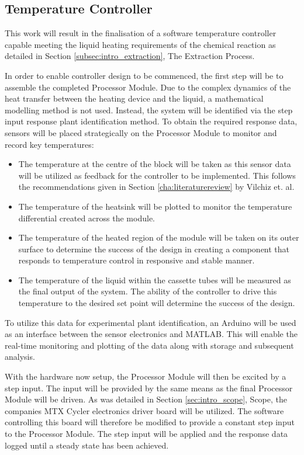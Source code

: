 \subsection{Temperature Controller}

This work will result in the finalisation of a software temperature controller capable meeting the liquid heating requirements of the chemical reaction as detailed in Section \ref{subsec:intro_extraction}, The Extraction Process.

In order to enable controller design to be commenced, the first step will be to assemble the completed Processor Module. Due to the complex dynamics of the heat transfer between the heating device and the liquid, a mathematical modelling method is not used. Instead, the system will be identified via the step input response plant identification method. To obtain the required response data, sensors will be placed strategically on the Processor Module to monitor and record key temperatures:
\begin{itemize}
	\item The temperature at the centre of the block will be taken as this sensor data will be utilized as feedback for the controller to be implemented. This follows the recommendations given in Section \ref{cha:literaturereview} by Vilchiz et. al.
	\item The temperature of the heatsink will be plotted to monitor the temperature differential created across the module.
	\item The temperature of the heated region of the module will be taken on its outer surface to determine the success of the design in creating a component that responds to temperature control in responsive and stable manner.
	\item The temperature of the liquid within the cassette tubes will be measured as the final output of the system. The ability of the controller to drive this temperature to the desired set point will determine the success of the design.
\end{itemize}

To utilize this data for experimental plant identification, an Arduino will be used as an interface between the sensor electronics and MATLAB. This will enable the real-time monitoring and plotting of the data along with storage and subsequent analysis.

With the hardware now setup, the Processor Module will then be excited by a step input. The input will be provided by the same means as the final Processor Module will be driven. As was detailed in Section \ref{sec:intro_scope}, Scope, the companies MTX Cycler electronics driver board will be utilized. The software controlling this board will therefore be modified to provide a constant step input to the Processor Module. The step input will be applied and the response data logged until a steady state has been achieved.

